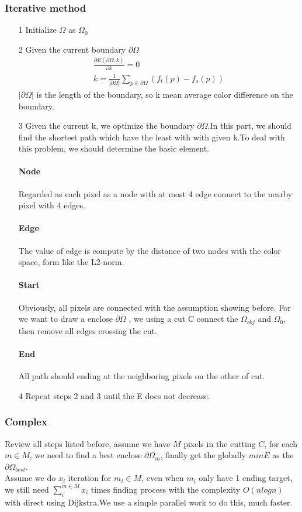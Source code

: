 \documentclass[letterpaper,12pt]{article}
\begin{document}
\subsubsection{Iterative method}
\begin{itemize}
	\item[1] Initialize $\Omega$ as $\Omega_0$
	\item[2] Given the current boundary $\partial\Omega$
	\begin{equation*}
	\begin{aligned}
	\frac{\partial E(\partial \Omega,k)}{\partial k} = 0\\
	k = \frac{1}{|\partial \Omega|}\sum_{p\in \partial \Omega}(f_t(p)-f_s(p))
	\end{aligned}
	\end{equation*}
	$|\partial \Omega|$ is the length of the boundary, so k mean average color difference on the boundary.
	\item[3]Given the current k, we optimize the boundary $\partial \Omega$.In this part, we
	should find the shortest path which have the least with with given k.To deal with this problem, we should determine the basic element.
	\paragraph{Node} Regarded as each pixel as a node with at most 4 edge connect to the nearby pixel with 4 edges.
	\paragraph{Edge} The value of edge is compute by the distance of two nodes with the color space, form like the L2-norm. 
	\paragraph{Start} Obviously, all pixels are connected with the assumption showing before. For we want to draw a enclose $\partial \Omega$ , we using a cut C connect the $\Omega_{obj}$ and $\Omega_0$, then remove all edges crossing the cut. 
	\paragraph{End}All path should ending at the neighboring pixels on the other of cut.
	\item[4]Repeat steps 2 and 3 until the E does not decrease.
\end{itemize}

\subsubsection{Complex}
Review all steps listed before, assume we have $M$ pixels in the cutting $C$, for each $m \in M$, we need to find a best enclose $\partial \Omega_m$, finally get the globally $minE$ as the 
$\partial \Omega_{best}$.
\\
Assume we do $x_i$ iteration for $m_i \in M$, even when $m_i$ only have 1 ending target, we still need $\sum^{m \in M}_i x_i$ times finding process with the complexity $O(nlogn)$ with direct using Dijkstra.We use a simple parallel work to do this, much faster.
\end{document}
